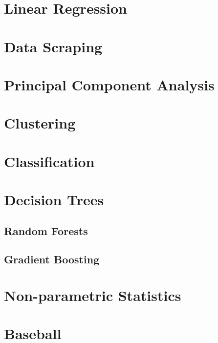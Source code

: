 \documentclass[
]{book}
\theoremstyle{definition}
\theoremstyle{definition}
\theoremstyle{definition}
\theoremstyle{definition}
\theoremstyle{remark}
\begin{document}
\hypertarget{linear-regression}{%
\chapter{Linear Regression}\label{linear-regression}}

\hypertarget{data-scraping}{%
\chapter{Data Scraping}\label{data-scraping}}

\hypertarget{principal-component-analysis}{%
\chapter{Principal Component Analysis}\label{principal-component-analysis}}

\hypertarget{clustering}{%
\chapter{Clustering}\label{clustering}}

\hypertarget{classification}{%
\chapter{Classification}\label{classification}}

\hypertarget{decision-trees}{%
\chapter{Decision Trees}\label{decision-trees}}

\hypertarget{random-forests}{%
\section{Random Forests}\label{random-forests}}

\hypertarget{gradient-boosting}{%
\section{Gradient Boosting}\label{gradient-boosting}}

\hypertarget{non-parametric-statistics}{%
\chapter{Non-parametric Statistics}\label{non-parametric-statistics}}

\hypertarget{baseball-1}{%
\chapter{Baseball}\label{baseball-1}}
\end{document}
